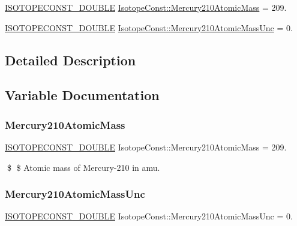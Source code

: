 \begin{DoxyCompactItemize}
\item 
\mbox{\hyperlink{group___isotope_const-_macros_ga8f45a7272ce02c0b4c65c44636ed719a}{I\+S\+O\+T\+O\+P\+E\+C\+O\+N\+S\+T\+\_\+\+D\+O\+U\+B\+LE}} \mbox{\hyperlink{group___isotope_const-_mercury-_hg210_gacc781c7d642bd2afc1b0f914264db3c4}{Isotope\+Const\+::\+Mercury210\+Atomic\+Mass}} = 209.
\item 
\mbox{\hyperlink{group___isotope_const-_macros_ga8f45a7272ce02c0b4c65c44636ed719a}{I\+S\+O\+T\+O\+P\+E\+C\+O\+N\+S\+T\+\_\+\+D\+O\+U\+B\+LE}} \mbox{\hyperlink{group___isotope_const-_mercury-_hg210_ga37322ca8010ba297e14c373c3cd74a77}{Isotope\+Const\+::\+Mercury210\+Atomic\+Mass\+Unc}} = 0.
\end{DoxyCompactItemize}


\subsection{Detailed Description}


\subsection{Variable Documentation}
\mbox{\label{group___isotope_const-_mercury-_hg210_gacc781c7d642bd2afc1b0f914264db3c4}} 
\subsubsection{\texorpdfstring{Mercury210\+Atomic\+Mass}{Mercury210AtomicMass}}
{\footnotesize\ttfamily \mbox{\hyperlink{group___isotope_const-_macros_ga8f45a7272ce02c0b4c65c44636ed719a}{I\+S\+O\+T\+O\+P\+E\+C\+O\+N\+S\+T\+\_\+\+D\+O\+U\+B\+LE}} Isotope\+Const\+::\+Mercury210\+Atomic\+Mass = 209.}

\$ \$ Atomic mass of Mercury-\/210 in amu. \mbox{\label{group___isotope_const-_mercury-_hg210_ga37322ca8010ba297e14c373c3cd74a77}} 
\subsubsection{\texorpdfstring{Mercury210\+Atomic\+Mass\+Unc}{Mercury210AtomicMassUnc}}
{\footnotesize\ttfamily \mbox{\hyperlink{group___isotope_const-_macros_ga8f45a7272ce02c0b4c65c44636ed719a}{I\+S\+O\+T\+O\+P\+E\+C\+O\+N\+S\+T\+\_\+\+D\+O\+U\+B\+LE}} Isotope\+Const\+::\+Mercury210\+Atomic\+Mass\+Unc = 0.}

